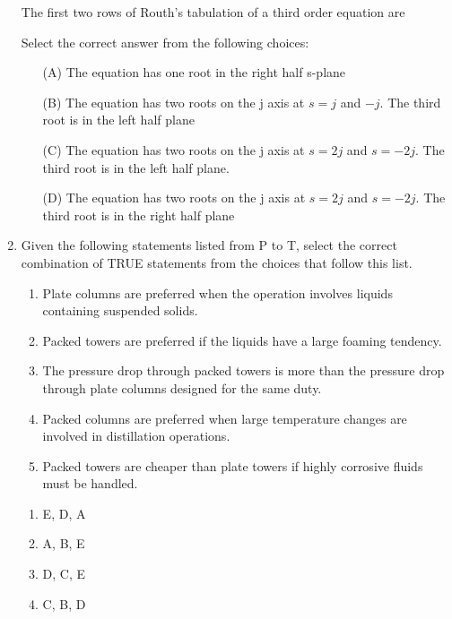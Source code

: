 \documentclass[journal,12pt,onecolumn]{IEEEtran}
\theoremstyle{remark}
\begin{document}
\begin{enumerate}
The first two rows of Routh's tabulation of a third order equation are



Select the correct answer from the following choices:


\begin{enumerate}
    \item[(A)] The equation has one root in the right half s-plane
    \item[(B)] The equation has two roots on the j axis at $s=j$ and $-j$. The third root is in the left half plane
    \item[(C)] The equation has two roots on the j axis at $s=2j$ and $s=-2j$. The third root is in the left half plane.
    \item[(D)] The equation has two roots on the j axis at $s=2j$ and $s=-2j$. The third root is in the right half plane
\end{enumerate}

    \item Given the following statements listed from P to T, select the correct combination of TRUE statements from the choices that follow this list.

\begin{enumerate}[label = \Alph*]
    \item Plate columns are preferred when the operation involves liquids containing suspended solids.
    \item Packed towers are preferred if the liquids have a large foaming tendency.
    \item The pressure drop through packed towers is more than the pressure drop through plate columns designed for the same duty.
    \item Packed columns are preferred when large temperature changes are involved in distillation operations.
    \item Packed towers are cheaper than plate towers if highly corrosive fluids must be handled.
\end{enumerate}

\begin{multicols}{4}
    

\begin{enumerate}
    \item E, D, A
    \item A, B, E
    \item D, C, E
    \item C, B, D
\end{enumerate}
\end{multicols}


\end{enumerate}
\end{document}
